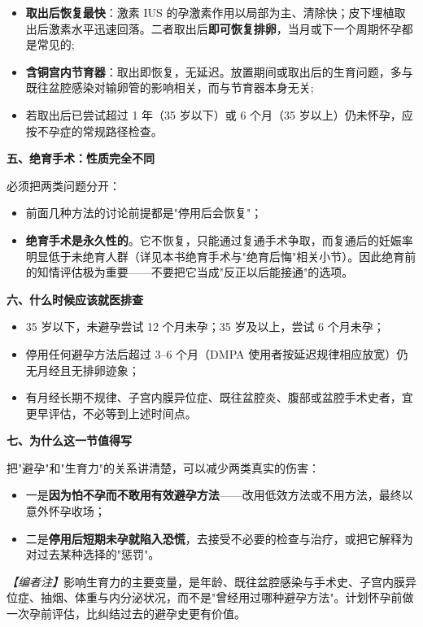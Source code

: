 \begin{itemize}
\item \textbf{取出后恢复最快}：激素 IUS 的孕激素作用以局部为主、清除快；皮下埋植取出后激素水平迅速回落。二者取出后\textbf{即可恢复排卵}，当月或下一个周期怀孕都是常见的;
\item \textbf{含铜宫内节育器}：取出即恢复，无延迟。放置期间或取出后的生育问题，多与既往盆腔感染对输卵管的影响相关，而与节育器本身无关;
\item 若取出后已尝试超过 1 年（35 岁以下）或 6 个月（35 岁以上）仍未怀孕，应按不孕症的常规路径检查。
\end{itemize}

\textbf{五、绝育手术：性质完全不同}

必须把两类问题分开：

\begin{itemize}
\item 前面几种方法的讨论前提都是"停用后会恢复"；
\item \textbf{绝育手术是永久性的}。它不恢复，只能通过复通手术争取，而复通后的妊娠率明显低于未绝育人群（详见本书绝育手术与"绝育后悔"相关小节）。因此绝育前的知情评估极为重要——不要把它当成"反正以后能接通"的选项。
\end{itemize}

\textbf{六、什么时候应该就医排查}

\begin{itemize}
\item 35 岁以下，未避孕尝试 12 个月未孕；35 岁及以上，尝试 6 个月未孕；
\item 停用任何避孕方法后超过 3--6 个月（DMPA 使用者按延迟规律相应放宽）仍无月经且无排卵迹象；
\item 有月经长期不规律、子宫内膜异位症、既往盆腔炎、腹部或盆腔手术史者，宜更早评估，不必等到上述时间点。
\end{itemize}

\textbf{七、为什么这一节值得写}

把"避孕"和"生育力"的关系讲清楚，可以减少两类真实的伤害：

\begin{itemize}
\item 一是\textbf{因为怕不孕而不敢用有效避孕方法}——改用低效方法或不用方法，最终以意外怀孕收场；
\item 二是\textbf{停用后短期未孕就陷入恐慌}，去接受不必要的检查与治疗，或把它解释为对过去某种选择的"惩罚"。
\end{itemize}

\textit{【编者注】}影响生育力的主要变量，是年龄、既往盆腔感染与手术史、子宫内膜异位症、抽烟、体重与内分泌状况，而不是"曾经用过哪种避孕方法"。计划怀孕前做一次孕前评估，比纠结过去的避孕史更有价值。

